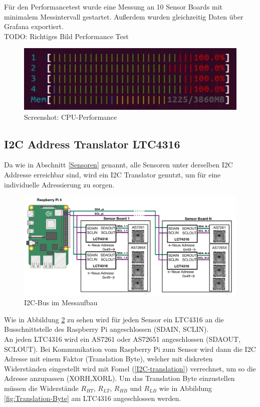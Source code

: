 Für den Performancetest wurde eine Messung an 10 Sensor Boards mit minimalem Messintervall gestartet.
Außerdem wurden gleichzeitig Daten über Grafana exportiert.\\
TODO: Richtiges Bild Performance Test\\
\begin{figure}[H]
  \centering
  \includegraphics[width=0.7\linewidth]{img/CPU-Performance.png}
  \caption{Screenshot: CPU-Performance}
  \label{fig:CPU-Performance}
\end{figure}

\subsection{I2C Address Translator LTC4316}\label{I2C-Translator}
Da wie in Abschnitt \ref{Sensoren} genannt, alle Sensoren unter derselben I2C Addresse erreichbar sind, wird ein I2C Translator genutzt, um für eine individuelle Adressierung zu sorgen.\\

\begin{figure}[H]
  \centering
 \includegraphics[width=1\linewidth]{img/Adress-Translation}
  \caption{I2C-Bus im Messaufbau \cite{raspberrypi_fundation}}
    \label{fig:adress-translation}
\end{figure}

\noindent Wie in Abbildung \ref{fig:adress-translation} zu sehen wird für jeden Sensor ein LTC4316 an die Busschnittstelle des Raspberry Pi angeschlossen (SDAIN, SCLIN).\\ 
An jeden LTC4316 wird ein AS7261 oder AS72651 angeschlossen (SDAOUT, SCLOUT).
Bei Kommunikation vom Raspberry Pi zum Sensor wird dann die I2C Adresse mit einem Faktor (Translation Byte), welcher mit diskreten Widerständen eingestellt wird mit Fomel (\ref{I2C-translation}) verrechnet, um so die Adresse anzupassen (XORH,XORL).
Um das Translation Byte einzustellen müssen die Widerstände $R_{HT}$, $R_{LT}$, $R_{HB}$ und $R_{LB}$ wie in Abbildung \ref{fig:Translation-Byte} am LTC4316 angeschlossen werden.


